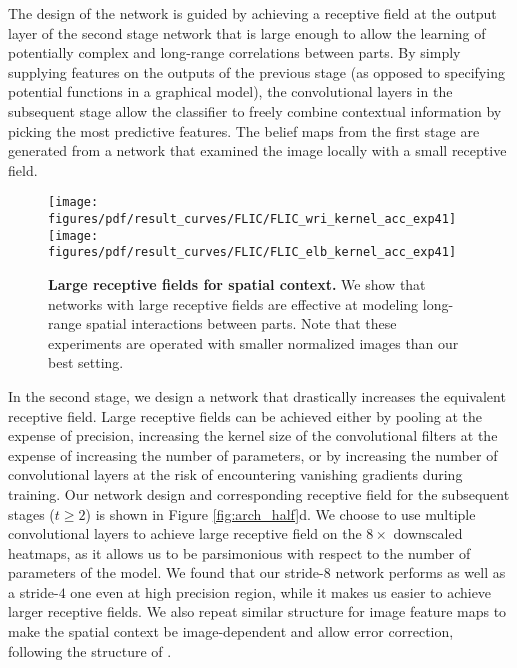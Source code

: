 \documentclass[10pt,twocolumn,letterpaper]{article}
\begin{document}
The design of the network is guided by achieving a receptive field at the output layer of the second stage network that is large enough to allow the learning of potentially complex and long-range correlations between parts. By simply supplying features on the outputs of the previous stage (as opposed to specifying potential functions in a graphical model), the convolutional layers in the subsequent stage allow the classifier to freely combine contextual information by picking the most predictive features. 
%
The belief maps from the first stage are generated from a network that examined the image locally with a small receptive field.
\begin{figure}[t!]
    \centering
    \texttt{[image: figures/pdf/result\_curves/FLIC/FLIC\_wri\_kernel\_acc\_exp41]}
    \texttt{[image: figures/pdf/result\_curves/FLIC/FLIC\_elb\_kernel\_acc\_exp41]}
    \caption{\textbf{Large receptive fields for spatial context.} We show that networks with large receptive fields are effective at modeling long-range spatial interactions between parts. Note that these experiments are operated with smaller normalized images than our best setting.}
    \label{fig:flic_kernels}
\end{figure}%
In the second stage, we design a network that drastically increases the equivalent receptive field. 
Large receptive fields can be achieved either by pooling at the expense of precision, increasing the kernel size of the convolutional filters at the expense of increasing the number of parameters, or by increasing the number of convolutional layers at the risk of encountering vanishing gradients during training. 
Our network design and corresponding receptive field for the subsequent stages ($t \geq 2$) is shown in Figure \ref{fig:arch_half}d.
We choose to use multiple convolutional layers to achieve large receptive field on the $8\times$ downscaled heatmaps, as it allows us to be parsimonious with respect to the number of parameters of the model. We found that our stride-$8$ network performs as well as a stride-$4$ one even at high precision region, while it makes us easier to achieve larger receptive fields.
We also repeat similar structure for image feature maps to make the spatial context be image-dependent and allow error correction, following the structure of \posemachine.
\end{document}
